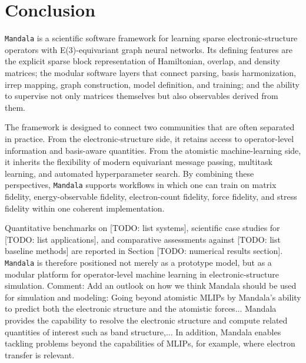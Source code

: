 \section{Conclusion}
\label{sec:conclusion}

\texttt{Mandala} is a scientific software framework for learning sparse electronic-structure operators with E(3)-equivariant graph neural networks. Its defining features are the explicit sparse block representation of Hamiltonian, overlap, and density matrices; the modular software layers that connect parsing, basis harmonization, irrep mapping, graph construction, model definition, and training; and the ability to supervise not only matrices themselves but also observables derived from them.

The framework is designed to connect two communities that are often separated in practice. From the electronic-structure side, it retains access to operator-level information and basis-aware quantities. From the atomistic machine-learning side, it inherits the flexibility of modern equivariant message passing, multitask learning, and automated hyperparameter search. By combining these perspectives, \texttt{Mandala} supports workflows in which one can train on matrix fidelity, energy-observable fidelity, electron-count fidelity, force fidelity, and stress fidelity within one coherent implementation.

Quantitative benchmarks on [TODO: list systems], scientific case studies for [TODO: list applications], and comparative assessments against [TODO: list baseline methods] are reported in Section [TODO: numerical results section]. \texttt{Mandala} is therefore positioned not merely as a prototype model, but as a modular platform for operator-level machine learning in electronic-structure simulation.
Comment: Add an outlook on how we think Mandala should be used for simulation and modeling: Going beyond atomistic MLIPs by Mandala's ability to predict both the electronic structure and the atomistic forces... Mandala provides the capability to resolve the electronic structure and compute related quantities of interest such as band structure,... In addition, Mandala enables tackling problems beyond the capabilities of MLIPs, for example, where electron transfer is relevant.
